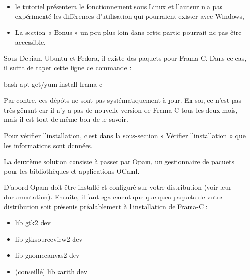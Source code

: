\begin{Warning}
\begin{itemize}
\item le tutoriel présentera le fonctionnement sous Linux et l'auteur n'a pas 
expérimenté les différences d'utilisation qui pourraient exister avec 
Windows,
\item La section « Bonus » un peu plus loin dans cette partie pourrait ne pas être
accessible.
\end{itemize}
\end{Warning}






Sous Debian, Ubuntu et Fedora, il existe des paquets pour Frama-C. Dans ce cas, 
il suffit de taper cette ligne de commande :



\begin{CodeBlock}{bash}
apt-get/yum install frama-c
\end{CodeBlock}



Par contre, ces dépôts ne sont pas systématiquement à jour. En soi, ce n'est pas très gênant car il n'y a pas de nouvelle version de Frama-C tous les deux mois, mais il est tout de même bon de le savoir.



Pour vérifier l'installation, c'est dans la sous-section « Vérifier l'installation »
que les informations sont données.





La deuxième solution consiste à passer par Opam, un gestionnaire de paquets 
pour les bibliothèques et applications OCaml.



D'abord Opam doit être installé et configuré sur votre distribution (voir 
leur documentation). Ensuite, il faut également que quelques paquets de votre
distribution soit présents préalablement à l'installation de Frama-C :



\begin{itemize}
\item lib gtk2 dev
\item lib gtksourceview2 dev
\item lib gnomecanvas2 dev
\item (conseillé) lib zarith dev
\end{itemize}


